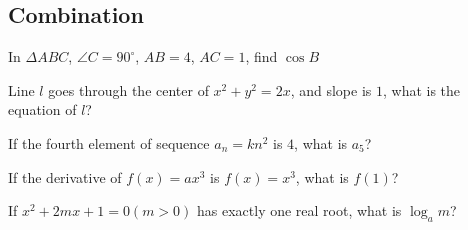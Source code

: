 \subsection{Combination}

\begin{example}
  In $\Delta ABC$, $\angle C = 90^\circ$, $AB=4$, $AC=1$, find $\cos{B}$
\end{example}

\begin{example}
  Line $l$ goes through the center of $x^2+y^2 = 2x$, and slope is $1$, what is the equation of $l$?
\end{example}

\begin{example}
  If the fourth element of sequence $a_n = kn^2$ is $4$, what is $a_5$?
\end{example}

\begin{example}
  If the derivative of $f(x) = a x^3$ is $f(x) = x^3$, what is $f(1)$?
\end{example}

\begin{example}
  If $x^2 + 2mx + 1 = 0 (m>0)$ has exactly one real root, what is $\log_a{m}$?
\end{example}

